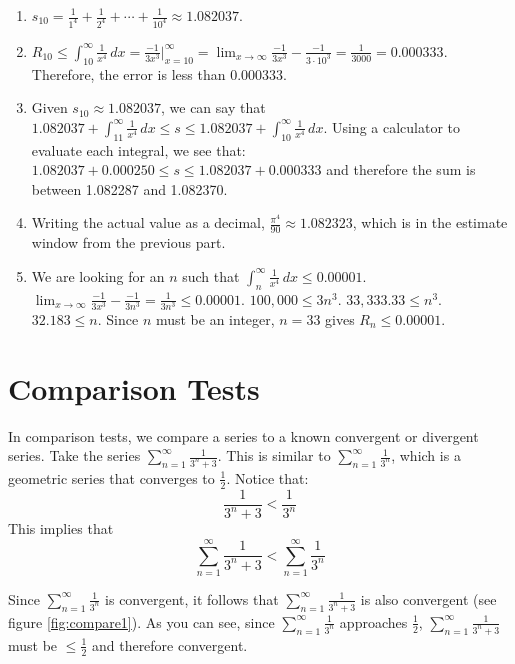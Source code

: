 \begin{Answer}[ref=remainder1]
\begin{enumerate}
\item $s_{10} = \frac{1}{1^4} + \frac{1}{2^4} + \cdots + \frac{1}{10^4} \approx 
1.082037$. 
\item $R_{10} \leq \int_{10}^\infty \frac{1}{x^4}\,dx = \frac{-1}{3x^3}|_
{x=10}^\infty = \lim_{x \to \infty} \frac{-1}{3x^3} - \frac{-1}{3 \cdot 10^3} 
= \frac{1}{3000} = 0.000333$. Therefore, the error is less than 0.000333. 
\item Given $s_{10} \approx 1.082037$, we can say that $1.082037 + \int_{11}^
\infty \frac{1}{x^4}\,dx \leq s \leq 1.082037 + \int_{10}^{\infty} \frac{1}{x^4}
\,dx$. Using a calculator to evaluate each integral, we see that: $1.082037 + 
0.000250 \leq s \leq 1.082037 + 0.000333$ and therefore the sum is between 
1.082287 and 1.082370. 
\item Writing the actual value as a decimal, $\frac{\pi^4}{90} \approx 
1.082323$, which is in the estimate window from the previous part. 
\item We are looking for an $n$ such that $\int_n^\infty \frac{1}{x^4}\,dx 
\leq 0.00001$. $\lim_{x \to \infty} \frac{-1}{3x^3} - \frac{-1}{3n^3} = 
\frac{1}{3n^3} \leq 0.00001$. $100,000 \leq 3n^3$. $33,333.33 \leq n^3$. 
$32.183 \leq n$. Since $n$ must be an integer, $n=33$ gives $R_n \leq 0.00001$. 
\end{enumerate}
\end{Answer}

\section{Comparison Tests}
 In comparison tests, we compare a series 
to a known convergent or divergent series. Take the series $\sum_{n=1}^\infty 
\frac{1}{3^n + 3}$. This is similar to $\sum_{n=1}^\infty \frac{1}{3^n}$, 
which is a geometric series that converges to $\frac{1}{2}$. Notice that:
$$\frac{1}{3^n + 3} < \frac{1}{3^n}$$
This implies that
$$\sum_{n=1}^\infty \frac{1}{3^n + 3} < \sum_{n=1}^\infty \frac{1}{3^n}$$

Since $\sum_{n=1}^\infty \frac{1}{3^n}$ is convergent, it follows that 
$\sum_{n=1}^\infty \frac{1}{3^n + 3}$ is also convergent (see figure 
\ref{fig:compare1}). As you can see, since  $\sum_{n=1}^\infty \frac{1}{3^n}$ 
approaches $\frac{1}{2}$, $\sum_{n=1}^\infty \frac{1}{3^n + 3}$ must be $\leq 
\frac{1}{2}$ and therefore convergent. 

